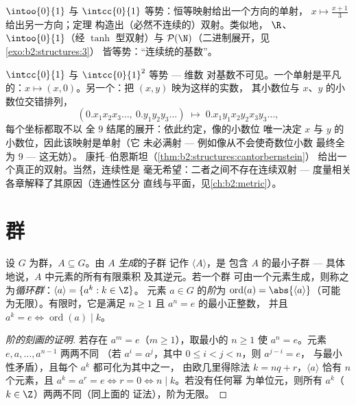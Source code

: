 \begin{example}\label{ex:b2:structures:cbexample}
$\intoo{0}{1}$ 与 $\intcc{0}{1}$ 等势：恒等映射给出一个方向的单射，
$x \mapsto \frac{x + 1}{3}$ 给出另一方向；定理
构造出（必然不连续的）双射。类似地，
$\R$、$\intoo{0}{1}$（经 $\tanh$ 型双射）与
$\mathcal{P}(\N)$（二进制展开，见\cref{exo:b2:structures:3}）
皆等势：“连续统的基数”。
\end{example}

\begin{example}[线段与正方形]\label{ex:b2:structures:squareseg}
$\intcc{0}{1}$ 与 $\intcc{0}{1}^2$ 等势 --- 维数
对基数不可见。一个单射是平凡的：$x
\mapsto (x, 0)$。另一个：把 $(x, y)$ 映为这样的实数，
其小数位与 $x$、$y$ 的小数位交错排列，
\[
(0.x_1x_2x_3\dots,\ 0.y_1y_2y_3\dots)
\;\longmapsto\; 0.x_1y_1x_2y_2x_3y_3\dots,
\]
每个坐标都取不以
全 $9$ 结尾的展开：依此约定，像的小数位
唯一决定 $x$ 与 $y$ 的小数位，因此该映射是单射（它
未必满射 --- 例如像从不会使奇数位小数
最终全为 $9$ --- 这无妨）。
康托–伯恩斯坦（\cref{thm:b2:structures:cantorbernstein}）
给出一个真正的双射。当然，连续性是
毫无希望：二者之间不存在连续双射 ---
度量相关各章解释了其原因（连通性区分
直线与平面，见\cref{ch:b2:metric}）。
\end{example}

\section{群}

\begin{definition}[生成子群；阶]\label{def:b2:structures:generated}
设 $G$ 为群，$A \subseteq G$。由 $A$ \emph{生成}的子群
记作 $\langle A \rangle$，是
包含 $A$ 的最小子群 --- 具体地说，$A$ 中元素的所有有限乘积
及其逆元。若一个群
可由一个元素生成，则称之为\emph{循环群}：$\langle a\rangle = \{a^k : k \in \Z\}$。
元素 $a \in G$ 的\emph{阶}为
$\operatorname{ord}(a) = \abs{\langle a \rangle}$（可能
为无限）。有限时，它是满足 $n \geq 1$ 且 $a^n = e$ 的最小正整数，
并且 $a^k = e \iff \operatorname{ord}(a) \mid k$。
\end{definition}

\begin{proof}[阶的刻画的证明]
若存在 $a^m = e$（$m \geq 1$），取最小的 $n \geq 1$ 使 $a^n
= e$。元素 $e, a, \dots, a^{n-1}$ 两两不同
（若 $a^{i} = a^{j}$，其中 $0 \leq i < j < n$，则 $a^{j-i} = e$，
与最小性矛盾），且每个 $a^k$ 都可化为其中之一，
由欧几里得除法 $k = nq + r$，$\langle a\rangle$ 恰有 $n$
个元素，且 $a^k = a^r = e \iff r = 0 \iff n \mid k$。若没有任何幂
为单位元，则所有 $a^k$（$k \in \Z$）两两不同（同上面的
证法），阶为无限。
\end{proof}

